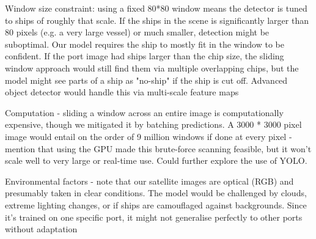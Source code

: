 \documentclass[11pt]{article}
\begin{document}
	Window size constraint: using a fixed 80*80 window means the detector is tuned to ships of roughly that scale. If the ships in the scene is significantly larger than 80 pixels (e.g. a very large vessel) or much smaller, detection might be suboptimal. Our model requires the ship to mostly fit in the window to be confident. If the port image had ships larger than the chip size, the sliding window approach would still find them via multiple overlapping chips, but the model might see parts of a ship as "no-ship" if the ship is cut off. Advanced object detector would handle this via multi-scale feature maps
	
	Computation - sliding a window across an entire image is computationally expensive, though we mitigated it by batching predictions. A 3000 * 3000 pixel image would entail on the order of 9 million windows if done at every pixel - mention that using the GPU made this brute-force scanning feasible, but it won't scale well to very large or real-time use. Could further explore the use of YOLO.
	
	Environmental factors - note that our satellite images are optical (RGB) and presumably taken in clear conditions. The model would be challenged by clouds, extreme lighting changes, or if ships are camouflaged against backgrounds. Since it's trained on one specific port, it might not generalise perfectly to other ports without adaptation
	
\end{document}
